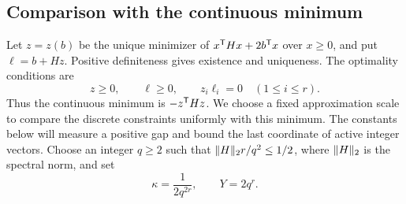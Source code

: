 \subsection{Comparison with the continuous minimum}
Let $z=z(b)$ be the unique minimizer of
$x^{\mathsf T} Hx+2b^{\mathsf T} x$ over $x\ge0$, and put $\ell=b+Hz$.
Positive definiteness gives existence and uniqueness. The optimality conditions are
\begin{equation}\label{eq:kkt}
 z\ge0,\qquad \ell\ge0,\qquad z_i\ell_i=0\quad(1\le i\le r).
\end{equation}
Thus the continuous minimum is $-z^{\mathsf T} Hz$. We choose a fixed approximation scale to compare the discrete constraints uniformly with this minimum. The constants below will measure a positive gap and bound the last coordinate of active integer vectors. Choose an integer $q\ge2$ such that $\lVert H\rVert_2r/q^2\le1/2$, where $\lVert H\rVert_2$ is the spectral norm, and set
\begin{equation}\label{eq:gapconstants}
 \kappa=\frac1{2q^{2r}},\qquad Y=2q^r.
\end{equation}


